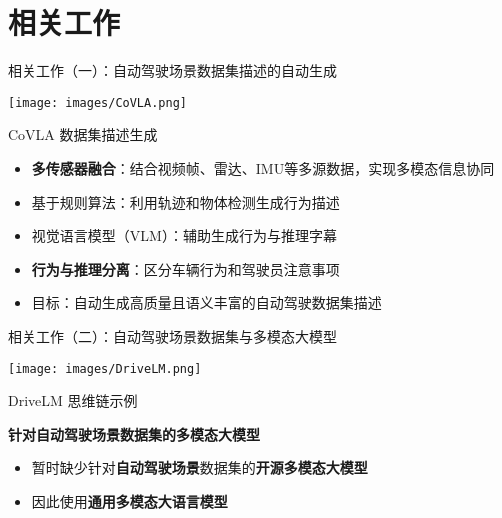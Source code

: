 \documentclass[serif]{beamer}
\begin{document}
\section{相关工作}

\begin{frame}{相关工作（一）：自动驾驶场景数据集描述的自动生成}

\begin{minipage}[t]{0.48\linewidth}
  \centering
  \texttt{[image: images/CoVLA.png]}
  \caption{CoVLA 数据集描述生成}
\end{minipage}
\hfill
\vspace{1em} %
\begin{minipage}[c]{0.48\linewidth} %
  \vspace{-15em} %
  \begin{itemize}
  \item \textbf{多传感器融合}：结合视频帧、雷达、IMU等多源数据，实现多模态信息协同
  \item 基于规则算法：利用轨迹和物体检测生成行为描述
  \item 视觉语言模型（VLM）：辅助生成行为与推理字幕
  \item \textbf{行为与推理分离}：区分车辆行为和驾驶员注意事项
  \item 目标：自动生成高质量且语义丰富的自动驾驶数据集描述
\end{itemize}

\end{minipage}


\end{frame}



\begin{frame}{相关工作（二）：自动驾驶场景数据集与多模态大模型}
\centering
\begin{minipage}{0.9\linewidth}
  \centering
  \texttt{[image: images/DriveLM.png]}
  
  {\footnotesize DriveLM 思维链示例}
\end{minipage}
\vspace{1em}
\begin{flushleft}
    \textbf{针对自动驾驶场景数据集的多模态大模型}
\end{flushleft}


\begin{itemize}
    \item 暂时缺少针对\textbf{自动驾驶场景}数据集的\textbf{开源多模态大模型}
    \item 因此使用\textbf{通用多模态大语言模型}
\end{itemize}
    
\end{frame}
\end{document}
